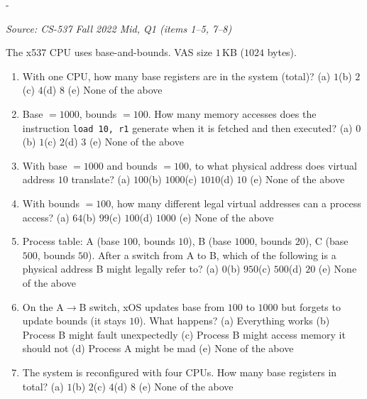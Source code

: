 \documentclass[11pt,a4paper]{article}
\makeatletter
\newcommand{\keepspace}[1]{\par\penalty-100\begingroup
  \setlength{\dimen@}{#1}\dimen@ii\pagegoal\advance\dimen@ii-\pagetotal
  \ifdim\dimen@>\dimen@ii\ifdim\dimen@ii>\z@\vfil\fi\break\fi\endgroup}
\newcounter{qn}[section]
\newenvironment{Qn}[4]{%
  \refstepcounter{qn}\keepspace{7\baselineskip}%
  \begin{tcolorbox}[qboxstyle, title={Q\thesection.\theqn\ \ [#1 \textbar\ #2]\ \ #4}]%
  {\footnotesize\color{g3}\textit{Source: #3}}\par\smallskip%
}{%
  \end{tcolorbox}%
}
\makeatother
\begin{document}
\begin{Qn}{Medium}{Lect 9}{CS-537 Fall 2022 Mid, Q1 (items 1--5, 7--8)}{x537 base-and-bounds: register count, \texttt{load}, and a forgotten bounds}
The x537 CPU uses base-and-bounds. VAS size $1$\,KB ($1024$ bytes).
\begin{enumerate}
  \item[1.] With one CPU, how many base registers are in the system
        (total)?
        (a) $1$\quad (b) $2$\quad (c) $4$\quad (d) $8$\quad
        (e) None of the above
  \item[2.] Base $=1000$, bounds $=100$. How many memory accesses does
        the instruction \texttt{load 10, r1} generate when it is
        fetched and then executed?
        (a) $0$\quad (b) $1$\quad (c) $2$\quad (d) $3$\quad
        (e) None of the above
  \item[3.] With base $=1000$ and bounds $=100$, to what physical
        address does virtual address $10$ translate?
        (a) $100$\quad (b) $1000$\quad (c) $1010$\quad (d) $10$\quad
        (e) None of the above
  \item[4.] With bounds $=100$, how many different legal virtual
        addresses can a process access?
        (a) $64$\quad (b) $99$\quad (c) $100$\quad (d) $1000$\quad
        (e) None of the above
  \item[5.] Process table:
        A (base $100$, bounds $10$),
        B (base $1000$, bounds $20$),
        C (base $500$, bounds $50$).
        After a switch from A to B, which of the following is a
        physical address B might legally refer to?
        (a) $0$\quad (b) $950$\quad (c) $500$\quad (d) $20$\quad
        (e) None of the above
  \item[7.] On the A$\to$B switch, xOS updates base from $100$ to
        $1000$ but forgets to update bounds (it stays $10$). What
        happens?
        (a) Everything works\quad
        (b) Process B might fault unexpectedly\quad
        (c) Process B might access memory it should not\quad
        (d) Process A might be mad\quad
        (e) None of the above
  \item[8.] The system is reconfigured with four CPUs. How many base
        registers in total?
        (a) $1$\quad (b) $2$\quad (c) $4$\quad (d) $8$\quad
        (e) None of the above
\end{enumerate}
\end{Qn}
\end{document}
